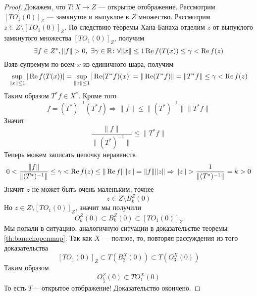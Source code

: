 \begin{proof}
	Докажем, что $T\colon X \to Z$ --- открытое отображение. Рассмотрим $[TO_1(0)]_Z$ --- замкнутое и выпуклое в $Z$ множество. Рассмотрим $z \in Z \setminus [TO_1(0)]_Z$. По следствию теоремы Хана-Банаха отделим $z$ от выпуклого замкнутого множества $[TO_1(0)]_Z$, получим 
	$$
	\exists f \in Z^*, \|f\| > 0 , \ \exists\gamma \in \R \colon\forall \|x\|\leq 1  \Rea f(T(x)) \leq \gamma < \Rea f(z)
	$$
	Взяв супремум по всем $x$ из единичного шара, получим
	$$
	\sup\limits_{\|x\| \leq 1} |\operatorname{Re} f(T(x))| = 	\sup\limits_{\|x\| \leq 1} |\operatorname{Re} (T^* f)(x)| = \|\operatorname{Re} (T^* f)\| = \|T^* f\|\leq\gamma < \operatorname{Re} f(z)
	$$
	Таким образом $T^* f \in X^*$. Кроме того 
	$$
	f = (T^*)^{-1}(T^*f) \Rightarrow \|f\| \leq \|(T^*)^{-1}\| \|T^*f\| 
	$$
	Значит
	$$
	\frac{\|f\|}{\|(T^*)^{-1}\|} \leq \|T^*f\|
	$$
	Теперь можем записать цепочку неравенств
	$$
	0 < \frac{\|f\|}{\|(T^*)^{-1}\|} \leq \gamma < \operatorname{Re} f(z) \leq \|\operatorname{Re} f\| \|z\| = \|f\| \|z\| \Rightarrow \|z\| > \frac{1}{\|(T^*)^{-1}\|} = k > 0
	$$
	Значит $z$ не может быть очень маленьким, точнее
	$$
	z \in Z \setminus B_{k}^Z(0) 
	$$
	Но $z \in Z \setminus [TO_1(0)]_Z$, значит мы получили
	$$
	O_k^Z(0) \subset B_{k}^Z(0)  \subset [TO_1(0)]_Z 
	$$
	Мы попали в ситуацию, аналогичную ситуации в доказательстве теоремы \ref{th:banachopenmap}. Так как $X$ --- полное, то, повторяя рассуждения из того доказательства 
	$$
	[TO_1(0)]_Z  \subset T(B_2^X(0)) \subset T(O_3^X(0))
	$$
	Таким образом 
	$$
	O_{\frac{k}{3}}^Z(0) \subset TO_1^X(0) 
	$$
	То есть $T$--- открытое отображение! Доказательство окончено.
\end{proof}
